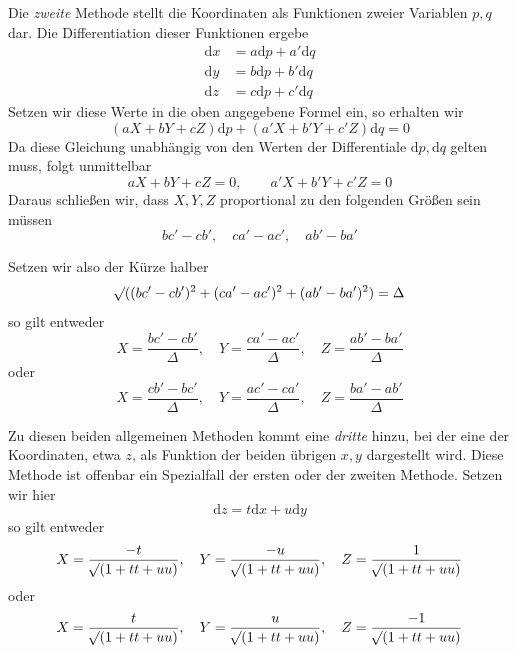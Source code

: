 \par\indent{}%
Die \textit{zweite} Methode stellt die Koordinaten als Funktionen zweier Variablen \(p,q\) dar. Die Differentiation dieser Funktionen ergebe
\[
\begin{aligned}
\mathrm{d}x&=a\mathrm{d}p+a'\mathrm{d}q\\
\mathrm{d}y&=b\mathrm{d}p+b'\mathrm{d}q\\
\mathrm{d}z&=c\mathrm{d}p+c'\mathrm{d}q
\end{aligned}
\]
\noindent Setzen wir diese Werte in die oben angegebene Formel ein, so erhalten wir
\[
(aX+bY+cZ)\mathrm{d}p+(a'X+b'Y+c'Z)\mathrm{d}q=0
\]
\noindent Da diese Gleichung unabhängig von den Werten der Differentiale \(\mathrm{d}p,\mathrm{d}q\) gelten muss, folgt unmittelbar
\[
aX+bY+cZ=0,\qquad a'X+b'Y+c'Z=0
\]
\noindent Daraus schließen wir, dass \(X,Y,Z\) proportional zu den folgenden Größen sein müssen
\[
bc'-cb',\quad ca'-ac',\quad ab'-ba'
\]
\par{}\indent Setzen wir also der Kürze halber
\[
\mathord{{}^{}\!\surd}((bc'-cb')^2+(ca'-ac')^2+(ab'-ba')^2)=\Delta
\]
\noindent so gilt entweder
\[
X=\frac{bc'-cb'}{\Delta},\quad Y=\frac{ca'-ac'}{\Delta},\quad Z=\frac{ab'-ba'}{\Delta}
\]
\noindent oder
\[
X=\frac{cb'-bc'}{\Delta},\quad Y=\frac{ac'-ca'}{\Delta},\quad Z=\frac{ba'-ab'}{\Delta}
\]
\par\indent Zu diesen beiden allgemeinen Methoden kommt eine \textit{dritte} hinzu, bei der eine der Koordinaten, etwa \(z\), als Funktion der beiden übrigen \(x,y\) dargestellt wird. Diese Methode ist offenbar ein Spezialfall der ersten oder der zweiten Methode. Setzen wir hier
\[
\mathrm{d}z=t\mathrm{d}x+u\mathrm{d}y
\]
\noindent so gilt entweder
\[
X=\frac{-t}{\mathord{{}^{}\!\surd}(1+tt+uu)},\quad Y=\frac{-u}{\mathord{{}^{}\!\surd}(1+tt+uu)},\quad Z=\frac{1}{\mathord{{}^{}\!\surd}(1+tt+uu)}
\]
\noindent oder
\[
X=\frac{t}{\mathord{{}^{}\!\surd}(1+tt+uu)},\quad Y=\frac{u}{\mathord{{}^{}\!\surd}(1+tt+uu)},\quad Z=\frac{-1}{\mathord{{}^{}\!\surd}(1+tt+uu)}
\]
